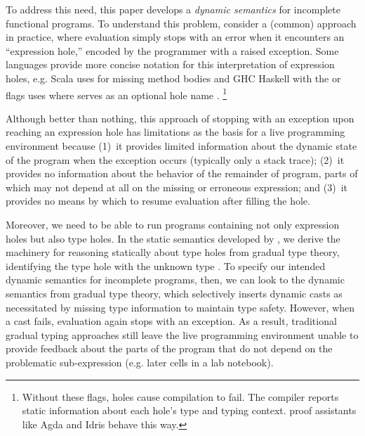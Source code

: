 To address this need,
this paper develops
a \emph{dynamic semantics} for incomplete functional programs.
%
To understand this problem, consider a (common) approach in practice, where evaluation simply stops with an error when it encounters an ``expression hole,'' encoded by the programmer with a raised exception.
Some languages provide more concise notation for this interpretation of expression holes, 
e.g. Scala uses  for missing method bodies 
and GHC Haskell with the  or  flags uses 
where  serves as an
optional hole name \cite{GHCWIKI}.%
\footnote{Without these flags, holes cause compilation to fail. The compiler reports static information about each hole's type and typing context. 
proof assistants like Agda \cite{norell:thesis,norell2009dependently} and Idris \cite{brady2013idris} behave this way.}

Although better than nothing, this approach of stopping with an exception upon reaching an expression hole has limitations 
as the basis for a live programming environment because 
(1)~it provides limited information about the dynamic state of the program when the exception occurs
(typically only a stack trace);  
(2)~it provides no information about the behavior of the remainder of program, 
parts of which may not depend at all on the missing or erroneous expression; and 
(3)~it provides no means by which to resume evaluation after filling the hole.

Moreover, we need to be able to run programs containing not only expression holes but also type holes.
In the static semantics developed by \citet{popl-paper}, we derive the machinery for 
reasoning statically about type holes from gradual type theory, 
identifying the type hole with the unknown type \cite{DBLP:conf/snapl/SiekVCB15,Siek06a}. 
To specify our intended dynamic semantics for incomplete programs, then, we can look to the dynamic semantics from
gradual type theory, which selectively inserts dynamic casts as necessitated by missing type information to maintain type safety. 
However, when a cast fails, evaluation again stops with 
an exception.
%
As a result, traditional gradual typing approaches still leave the live programming environment unable to provide feedback about the parts 
of the program that do not depend on the problematic sub-expression (e.g. later cells in a lab notebook).


